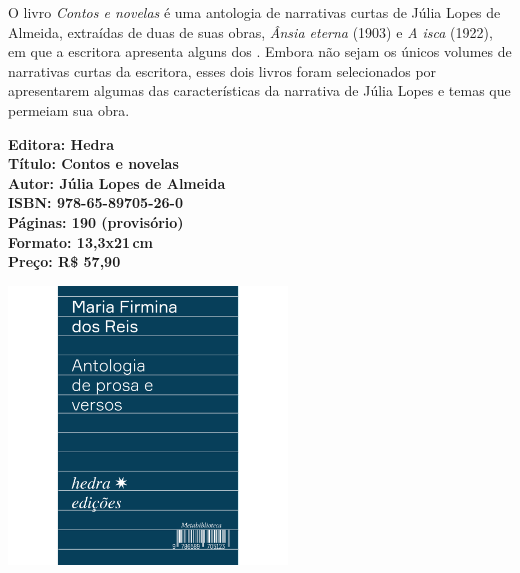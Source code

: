 \hspace*{-7cm}\hrulefill\hspace*{-7cm}

\medskip

\noindent{}O livro \textit{Contos e novelas} é uma antologia de narrativas curtas de Júlia Lopes de Almeida, extraídas de duas de suas obras, \textit{Ânsia eterna} (1903) e \textit{A isca} (1922), em que a escritora apresenta alguns dos . Embora não sejam os únicos volumes de narrativas curtas da escritora, esses dois livros foram selecionados por apresentarem algumas das características da narrativa de Júlia Lopes e temas que permeiam sua obra.

\vfill

\noindent\begin{minipage}[c]{1\linewidth}
{\small\textbf{
\hspace*{-.1cm}Editora: Hedra\\
Título: Contos e novelas\\
Autor: Júlia Lopes de Almeida\\ 
ISBN: 978-65-89705-26-0\\
Páginas: 190 (provisório)\\
Formato: 13,3x21\,cm\\
Preço: R\$ 57,90\\
}}
\end{minipage}

\pagebreak


\begin{center}
\hspace*{-3.6cm}
\hspace*{3.1cm}\includegraphics[width=74mm]{./CAPAS/firmina.jpg}
\end{center}

